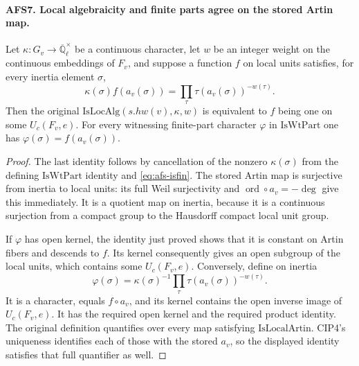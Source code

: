 \paragraph{AFS7. Local algebraicity and finite parts agree on the stored Artin map.}
\label{claim:AFS7}
Let $\kappa:G_v\to\overline{\mathbb Q}_\ell^{\times}$ be a
continuous character, let $w$ be an integer weight on the
continuous embeddings of $F_v$, and suppose a function $f$
on local units satisfies, for every inertia element $\sigma$,
\begin{equation}\label{eq:afs-isfin}
 \kappa(\sigma)f(a_v(\sigma))
                =\prod_\tau\tau(a_v(\sigma))^{-w(\tau)}.
\end{equation}
Then the original $\mathrm{IsLocAlg}(s.hw(v),\kappa,w)$ is
equivalent to $f$ being one on some $U_c(F_v,e)$.
For every witnessing finite-part character $\varphi$ in
$\mathrm{IsWtPart}$ one has
$\varphi(\sigma)=f(a_v(\sigma))$.
\begin{proof}
The last identity follows by cancellation of the nonzero
$\kappa(\sigma)$ from the defining $\mathrm{IsWtPart}$
identity and \eqref{eq:afs-isfin}.  The stored Artin map is
surjective from inertia to local units: its full Weil
surjectivity and $\operatorname{ord}\circ a_v=-\deg$ give
this immediately.  It is a quotient map on inertia, because
it is a continuous surjection from a compact group to the
Hausdorff compact local unit group.

If $\varphi$ has open kernel, the identity just proved shows
that it is constant on Artin fibers and descends to $f$.
Its kernel consequently gives an open subgroup of the local
units, which contains some $U_c(F_v,e)$.  Conversely, define
on inertia
\[
 \varphi(\sigma)=\kappa(\sigma)^{-1}
                       \prod_\tau\tau(a_v(\sigma))^{-w(\tau)}.
\]
It is a character, equals $f\circ a_v$, and its kernel
contains the open inverse image of $U_c(F_v,e)$.  It has
the required open kernel and the required product identity.
The original definition quantifies over every map satisfying
$\mathrm{IsLocalArtin}$.  CIP4's uniqueness identifies each
of those with the stored $a_v$, so the displayed identity
satisfies that full quantifier as well.
\end{proof}

